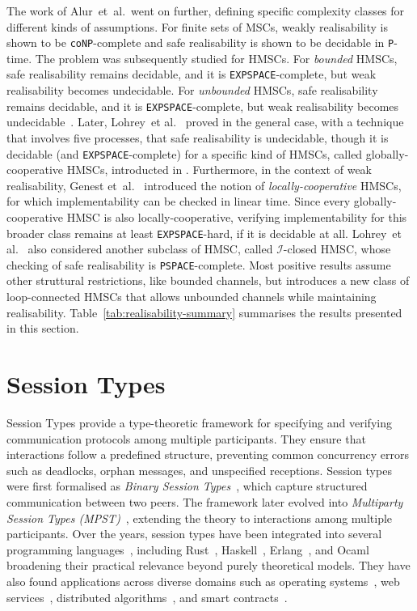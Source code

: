 The work of Alur~et~al.~went on further, defining specific complexity classes 
for different kinds of assumptions. For finite sets of MSCs,
weakly realisability is shown to be \verb|coNP|-complete and safe 
realisability is shown to be decidable in \verb|P|-time. The problem
was subsequently studied for HMSCs. For \emph{bounded} HMSCs, safe realisability 
remains decidable, and it is \verb|EXPSPACE|-complete, but weak realisability 
becomes undecidable. For \emph{unbounded} HMSCs, 
safe realisability remains decidable, and it is \verb|EXPSPACE|-complete, but weak realisability 
becomes undecidable~\cite{alur2005realizability}. 
Later, Lohrey~et al.~\cite{lohrey2003realizability} proved in the general case, 
with a technique that involves five processes, that safe realisability 
is undecidable, though it is decidable (and \verb|EXPSPACE|-complete) 
for a specific kind of HMSCs, called globally-cooperative HMSCs, introducted 
in \cite{morin2002recognizable}.
Furthermore, in the context of weak realisability,
Genest et~al.~\cite{genest2006infinite} introduced the notion of
\emph{locally-cooperative} HMSCs, for which implementability can be
checked in linear time.
Since every globally-cooperative HMSC is also locally-cooperative,
verifying implementability for this broader class remains at least
\verb|EXPSPACE|-hard, if it is decidable at all.
Lohrey~et al.~\cite{lohrey2003realizability} also considered another subclass of HMSC,
called $\mathcal{I}$-closed HMSC, whose checking of safe realisability is \verb|PSPACE|-complete.
Most positive results assume other struttural restrictions, like bounded channels, 
but \cite{bollig2025high} introduces a new class of loop-connected HMSCs
that allows unbounded channels while maintaining realisability.
Table~\ref{tab:realisability-summary} summarises the results presented in this section.

\section{Session Types}
Session Types provide a type-theoretic framework for specifying and verifying 
communication protocols among multiple participants.  
They ensure that interactions follow a predefined structure, 
preventing common concurrency errors such as deadlocks, orphan messages, 
and unspecified receptions. 
Session types were first formalised as 
\emph{Binary Session Types}~\cite{honda1993types}, 
which capture structured communication between two peers.  
The framework later evolved into 
\emph{Multiparty Session Types (MPST)}~\cite{honda2008multiparty}, 
extending the theory to interactions among multiple participants.  
Over the years, session types have been integrated into several programming 
languages~\cite{DBLP:journals/ftpl/AnconaBB0CDGGGH16}, including 
Rust~\cite{jespersen2015session,chen2020ferrite}, 
Haskell~\cite{lindley2016embedding}, 
Erlang~\cite{mostrous2011session}, and
Ocaml~\cite{padovani2017simple}
broadening their practical relevance beyond purely theoretical models.  
They have also found applications across diverse domains such as 
operating systems~\cite{fahndrich2006language}, 
web services~\cite{yoshida2013scribble}, 
distributed algorithms~\cite{kouzapas2024session}, 
and smart contracts~\cite{das2021resource}.  

